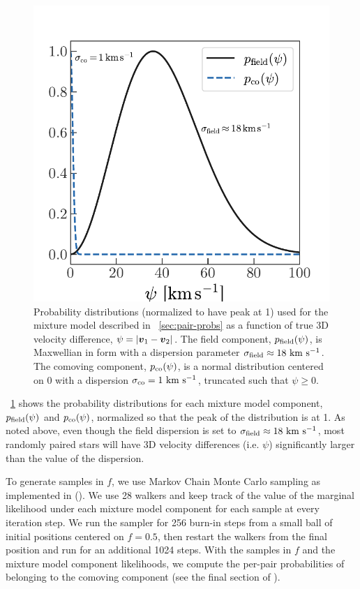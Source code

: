 \documentclass[modern, letterpaper]{aastex61}
\begin{document}
\begin{figure}[htb]
  \begin{center}
    \includegraphics[width=0.75\linewidth]{mixture-model-demo.pdf}
  \end{center}
  \caption{%
    Probability distributions (normalized to have peak at 1) used for the
    mixture model described in \sectionname~\ref{sec:pair-probs} as a function
    of true 3D velocity difference, $\psi = \left| \boldsymbol{v}_1 - \boldsymbol{v}_2 \right|$.
    The field component, $p_{\rm field}(\psi)$, is Maxwellian in form with a
    dispersion parameter $\sigma_{\rm field} \approx 18~\mathrm{km}~\mathrm{s}^{-1}$.
    The comoving component, $p_{\rm co}(\psi)$, is a normal distribution
    centered on 0 with a dispersion $\sigma_{\rm co} = 1~\mathrm{km}~\mathrm{s}^{-1}$, truncated such
    that $\psi \geq 0$.
    \label{fig:mixture-model-demo}}
\end{figure}

\figurename~\ref{fig:mixture-model-demo} shows the probability distributions for
each mixture model component, $p_{\rm field}(\psi)$ and $p_{\rm co}(\psi)$,
normalized so that the peak of the distribution is at 1.
As noted above, even though the field dispersion is set to $\sigma_{\rm field}
\approx 18~\mathrm{km}~\mathrm{s}^{-1}$, most randomly paired stars will have 3D velocity differences
(i.e. $\psi$) significantly larger than the value of the dispersion.

To generate samples in $f$, we use Markov Chain Monte Carlo sampling as
implemented in  (\citealt{Foreman-Mackey:2013}).
We use 28 walkers and keep track of the value of the marginal likelihood under
each mixture model component for each sample at every iteration step.
We run the sampler for 256 burn-in steps from a small ball of initial positions
centered on $f=0.5$, then restart the walkers from the final position and run
for an additional 1024 steps.
With the samples in $f$ and the mixture model component likelihoods, we compute
the per-pair probabilities of belonging to the comoving component (see the final
section of \citealt{Foreman-Mackey:2014}).
\end{document}
